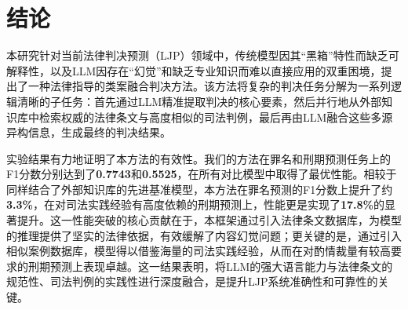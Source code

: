 
\section{\heiti 结论}
本研究针对当前法律判决预测（LJP）领域中，传统模型因其“黑箱”特性而缺乏可解释性，以及LLM因存在“幻觉”和缺乏专业知识而难以直接应用的双重困境，提出了一种法律指导的类案融合判决方法。该方法将复杂的判决任务分解为一系列逻辑清晰的子任务：首先通过LLM精准提取判决的核心要素，然后并行地从外部知识库中检索权威的法律条文与高度相似的司法判例，最后再由LLM融合这些多源异构信息，生成最终的判决结果。

实验结果有力地证明了本方法的有效性。我们的方法在罪名和刑期预测任务上的F1分数分别达到了\textbf{0.7743}和\textbf{0.5525}，在所有对比模型中取得了最优性能。相较于同样结合了外部知识库的先进基准模型，本方法在罪名预测的F1分数上提升了约\textbf{3.3\%}，在对司法实践经验有高度依赖的刑期预测上，性能更是实现了\textbf{17.8\%}的显著提升。这一性能突破的核心贡献在于，本框架通过引入法律条文数据库，为模型的推理提供了坚实的法律依据，有效缓解了内容幻觉问题；更关键的是，通过引入相似案例数据库，模型得以借鉴海量的司法实践经验，从而在对酌情裁量有较高要求的刑期预测上表现卓越。这一结果表明，将LLM的强大语言能力与法律条文的规范性、司法判例的实践性进行深度融合，是提升LJP系统准确性和可靠性的关键。